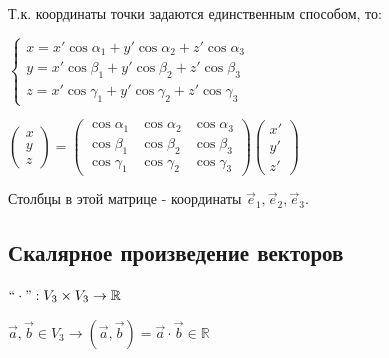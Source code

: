 \documentclass[twoside]{book}
\begin{document}
\begin{enumerate}[label=\alph*)]
\begin{itemize}
                    Т.к. координаты точки задаются единственным способом, то:

                    \(\begin{cases*}
                        x = x'\cos\alpha_1 + y'\cos\alpha_2 + z'\cos\alpha_3 \\
                        y = x'\cos\beta_1 + y'\cos\beta_2 + z'\cos\beta_3    \\
                        z = x'\cos\gamma_1 + y'\cos\gamma_2 + z'\cos\gamma_3
                    \end{cases*}\)

                    \(\begin{pmatrix}
                        x \\
                        y \\
                        z
                    \end{pmatrix} =
                    \begin{pmatrix}
                        \cos\alpha_1 & \cos\alpha_2 & \cos\alpha_3 \\
                        \cos\beta_1  & \cos\beta_2  & \cos\beta_3  \\
                        \cos\gamma_1 & \cos\gamma_2 & \cos\gamma_3
                    \end{pmatrix}
                    \begin{pmatrix}
                        x' \\
                        y' \\
                        z'
                    \end{pmatrix}\)

                    Столбцы в этой матрице - координаты \(\vec e_1, \vec e_2, \vec e_3\).
          \end{itemize}
\end{enumerate}

\subsection{Скалярное произведение векторов}

\(``\cdot": V_3 \times V_3 \rightarrow \mathbb{R}\)

\(\vec a, \vec b \in V_3 \rightarrow (\vec a, \vec b) = \vec a \cdot \vec b \in \mathbb{R}\)
\end{document}
